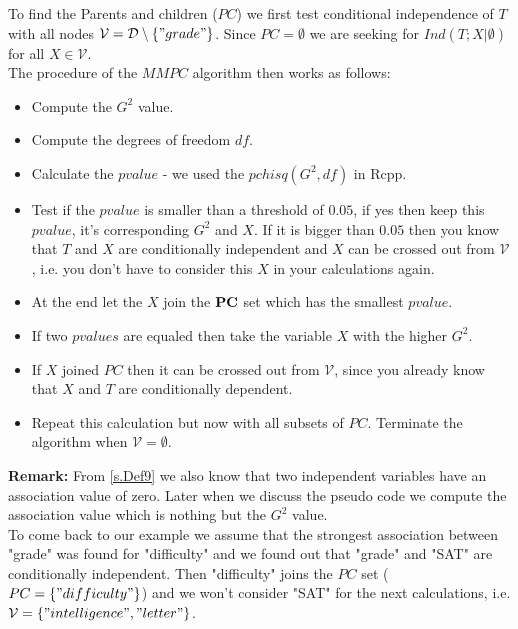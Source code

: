 			 \label{img.gradeSelected}

			To find the Parents and children ($PC$) we first test conditional independence of $T$ with all nodes $\mathcal{V} = \mathcal{D} \setminus \{"grade"\}$. Since $PC = \emptyset$ we are seeking for $Ind(T; X | \emptyset)$ for all $X \in \mathcal{V}$.\\
			The procedure of the $MMPC$ algorithm then works as follows:

			\begin{itemize}
				\item Compute the $G^{2}$ value.
				\item Compute the degrees of freedom $df$.
				\item Calculate the $pvalue$ - we used the $pchisq(G^{2}, df)$ in Rcpp.
				\item Test if the $pvalue$ is smaller than a threshold of $0.05$, if yes then keep this $pvalue$, it's corresponding $G^{2}$ and $X$. If it is bigger than $0.05$ then you know that $T$ and $X$ are conditionally independent and $X$ can be crossed out from $\mathcal{V}$, i.e. you don't have to consider this $X$ in your calculations again.
				\item At the end let the $X$ join the ${\textbf{PC}}$ set which has the smallest $pvalue$.
				\item If two $pvalues$ are equaled then take the variable $X$ with the higher $G^{2}$.
				\item If $X$ joined $PC$ then it can be crossed out from $\mathcal{V}$, since you already know that $X$ and $T$ are conditionally dependent.
				\item Repeat this calculation but now with all subsets of $PC$. Terminate the algorithm when $\mathcal{V} = \emptyset$.
			\end{itemize}

			\textbf{Remark:} From \autoref{s.Def9} we also know that two independent variables have an association value of zero. Later when we discuss the pseudo code we compute the association value which is nothing but the $G^{2}$ value. \\

			To come back to our example we assume that the strongest association between "grade" was found for "difficulty" and we found out that "grade" and "SAT" are conditionally independent. Then "difficulty" joins the $PC$ set ($PC = \{"difficulty"\}$) and we won't consider "SAT" for the next calculations, i.e. $\mathcal{V} = \{ "intelligence", "letter" \}$.

